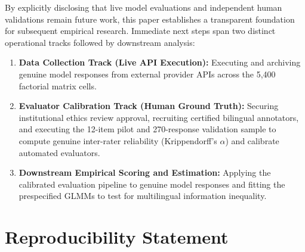 \documentclass[11pt,a4paper]{article}
\begin{document}
By explicitly disclosing that live model evaluations and independent human validations remain future work, this paper establishes a transparent foundation for subsequent empirical research. Immediate next steps span two distinct operational tracks followed by downstream analysis:
\begin{enumerate}
  \item \textbf{Data Collection Track (Live API Execution):} Executing and archiving genuine model responses from external provider APIs across the 5,400 factorial matrix cells.
  \item \textbf{Evaluator Calibration Track (Human Ground Truth):} Securing institutional ethics review approval, recruiting certified bilingual annotators, and executing the 12-item pilot and 270-response validation sample to compute genuine inter-rater reliability (Krippendorff's $\alpha$) and calibrate automated evaluators.
  \item \textbf{Downstream Empirical Scoring and Estimation:} Applying the calibrated evaluation pipeline to genuine model responses and fitting the prespecified GLMMs to test for multilingual information inequality.
\end{enumerate}

\section*{Reproducibility Statement}
\label{sec:reproducibility}
\end{document}
